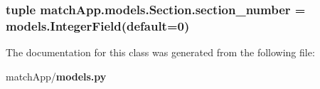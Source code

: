 \subsubsection[{section\+\_\+number}]{\setlength{\rightskip}{0pt plus 5cm}tuple match\+App.\+models.\+Section.\+section\+\_\+number = models.\+Integer\+Field(default=0)\hspace{0.3cm}{\ttfamily [static]}}\label{classmatch_app_1_1models_1_1_section_ae71939f61c0134b1bc0e02eab1b517d3}


The documentation for this class was generated from the following file\+:\begin{DoxyCompactItemize}
\item 
match\+App/{\bf models.\+py}\end{DoxyCompactItemize}
